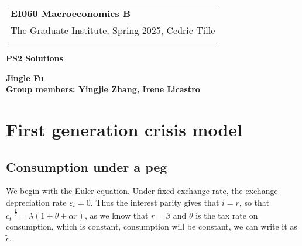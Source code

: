 \documentclass[a4paper,12pt]{article} %
\theoremstyle{nonitalic}
\begin{document}
\thispagestyle{empty} %

\begin{tabular}{p{15.5cm}} %
{\large \bf EI060 Macroeconomics B} \\
The Graduate Institute, Spring 2025, Cedric Tille\\
\hline %
\\
\end{tabular} %

\vspace*{0.3cm} %

\begin{center} %
	{\Large \bf PS2 Solutions} %
	\vspace{2mm}
	
	{\bf Jingle Fu \\ Group members: Yingjie Zhang, Irene Licastro} %
		
\end{center}  

\vspace{0.4cm}

\section{First generation crisis model}

\subsection{Consumption under a peg}\label{sec:1.1}

We begin with the Euler equation. Under fixed exchange rate, the exchange depreciation rate $\varepsilon_t = 0$.
Thus the interest parity gives that $i = r$, so that $c_t^{-\frac{1}{\sigma}} = \lambda (1 + \theta + \alpha r)$,
as we know that $r=\beta$ and $\theta$ is the tax rate on consumption, which is constant,
consumption will be constant, we can write it as $\tilde{c}$.
\end{document}
